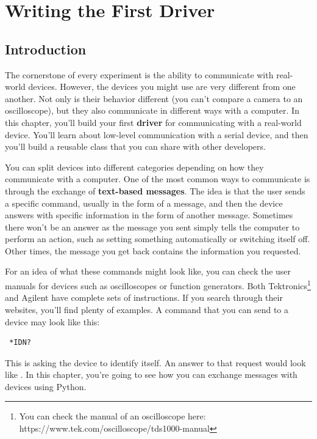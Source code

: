 \chapter{Writing the First Driver}\label{ch:first-driver}

\section{Introduction}\label{sec:driver-introduction}
The cornerstone of every experiment is the ability to communicate with real-world devices. However, the devices you might use are very different from one another. Not only is their behavior different (you can't compare a camera to an oscilloscope), but they also communicate in different ways with a computer. In this chapter, you'll build your first \textbf{driver} for communicating with a real-world device. You'll learn about low-level communication with a serial device, and then you'll build a reusable class that you can share with other developers.

You can split devices into different categories depending on how they communicate with a computer. One of the most common ways to communicate is through the exchange of \textbf{text-based messages}. The idea is that the user sends a specific command, usually in the form of a message, and then the device answers with specific information in the form of another message. Sometimes there won't be an answer as the message you sent simply tells the computer to perform an action, such as setting something automatically or switching itself off. Other times, the message you get back contains the information you requested.

For an idea of what these commands might look like, you can check the user manuals for devices such as oscilloscopes or function generators. Both Tektronics\footnote{You can check the manual of an oscilloscope here: https://www.tek.com/oscilloscope/tds1000-manual} and Agilent have complete sets of instructions. If you search through their websites, you'll find plenty of examples. A command that you can send to a device may look like this:

\begin{verbatim}
 *IDN?
\end{verbatim}

This is asking the device to identify itself. An answer to that request would look like . In this chapter, you're going to see how you can exchange messages with devices using Python.

